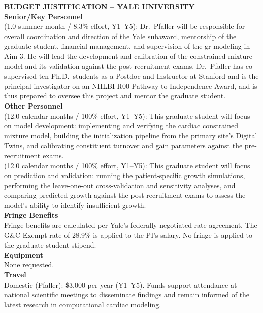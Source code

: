 \documentclass[11pt]{article}
\begin{document}
\textbf{\uppercase{Budget Justification -- Yale University}}\\[.5em]
\textbf{Senior/Key Personnel}\\[0em]
 (1.0 summer month / 8.3\% effort, Y1--Y5): Dr.\ Pfaller will be responsible for overall coordination and direction of the Yale subaward, mentorship of the graduate student, financial management, and supervision of the \gls*{gr} modeling in Aim 3. He will lead the development and calibration of the constrained mixture model and its validation against the post-recruitment exams. Dr.\ Pfaller has co-supervised ten Ph.D.\ students as a Postdoc and Instructor at Stanford and is the principal investigator on an NHLBI R00 Pathway to Independence Award, and is thus prepared to oversee this project and mentor the graduate student.\\[.5em]
\textbf{Other Personnel}\\[0em]
 (12.0 calendar months / 100\% effort, Y1--Y5): This graduate student will focus on model development: implementing and verifying the cardiac constrained mixture model, building the initialization pipeline from the primary site's Digital Twins, and calibrating constituent turnover and gain parameters against the pre-recruitment exams.\\[.3em]
 (12.0 calendar months / 100\% effort, Y1--Y5): This graduate student will focus on prediction and validation: running the patient-specific growth simulations, performing the leave-one-out cross-validation and sensitivity analyses, and comparing predicted growth against the post-recruitment exams to assess the model's ability to identify insufficient growth.\\[.5em]
\textbf{Fringe Benefits}\\[0em]
Fringe benefits are calculated per Yale's federally negotiated rate agreement. The G\&C Exempt rate of 28.9\% is applied to the PI's salary. No fringe is applied to the graduate-student stipend.\\[.5em]
\textbf{Equipment}\\[0em]
None requested.\\[.5em]
\textbf{Travel}\\[0em]
Domestic (Pfaller): \$3,000 per year (Y1--Y5). Funds support attendance at national scientific meetings to disseminate findings and remain informed of the latest research in computational cardiac modeling.\\[.5em]
\end{document}
